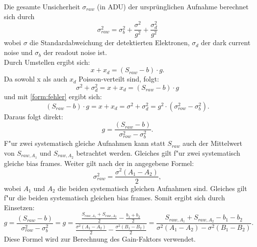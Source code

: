 Die gesamte Unsicherheit $\sigma_{raw}$ (in ADU) der ursprünglichen Aufnahme berechnet sich durch 
\begin{equation}
\sigma_{raw}^2 = \sigma_b^2 + \frac{\sigma^2}{g^2} + \frac{\sigma_{d}^2}{g^2}
\label{form:fehler}
\end{equation}
wobei $\sigma$ die Standardabweichung der detektierten Elektronen, $\sigma_d$ der dark current noise und $\sigma_{b}$ der readout noise ist.\\ Durch Umstellen ergibt sich:
\begin{equation}
x + x_d = (S_{raw} - b) \cdot g.
\end{equation}
Da sowohl x als auch $x_d$ Poisson-verteilt sind, folgt:
\begin{equation}
\sigma^2 + \sigma_d^2 = x + x_d = (S_{raw} - b) \cdot g
\end{equation}
und mit \eqref{form:fehler} ergibt sich:
\begin{equation}
(S_{raw} - b) \cdot g = x + x_d = \sigma^2 + \sigma_d^2 = g^2 \cdot (\sigma_{row}^2 - \sigma_{b}^2).
\end{equation}
Daraus folgt direkt:
\begin{equation}
g = \frac{(S_{raw} - b)}{\sigma_{row}^2 - \sigma_{b}^2}.
\end{equation}
F"ur zwei systematisch gleiche Aufnahmen kann statt $S_{raw}$ auch der Mittelwert von $S_{raw,A_1}$ und $S_{raw,A_2}$ betrachtet werden. Gleiches gilt f"ur zwei systematisch gleiche bias frames. 
Weiter gilt nach der in \cite{astr} angegebene Formel:
\begin{equation}
\sigma_{raw}^2 = \frac{\sigma^2(A_1 - A_2)}{2}, 
\end{equation}
wobei $A_1$ und $A_2$ die beiden systematisch gleichen Aufnahmen sind. Gleiches gilt f"ur die beiden systematisch gleichen bias frames. 
Somit ergibt sich durch Einsetzen: 
\begin{equation}
g = \frac{(S_{raw} - b)}{\sigma_{row}^2 - \sigma_{b}^2} = g = \frac{\frac{S_{raw,A_1} + S_{raw,A_2}}{2} - \frac{b_1 + b_2}{2}}{\frac{\sigma^2(A_1 - A_2)}{2} - \frac{\sigma^2(B_1 - B_2)}{2}} = \frac{S_{raw,A_1} + S_{raw,A_2} - b_1 - b_2}{\sigma^2(A_1 - A_2) - \sigma^2(B_1 - B_2)}.
\label{form:gain}
\end{equation}
Diese Formel wird zur Berechnung des Gain-Faktors verwendet. 

